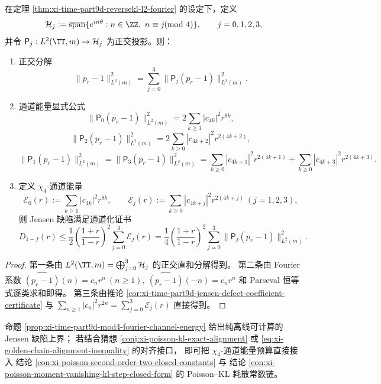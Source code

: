 \begin{proposition}\label{prop:xi-time-part9d-mod4-fourier-channel-energy}
在定理 \ref{thm:xi-time-part9d-reversekl-l2-fourier} 的设定下，定义
\[
\mathcal H_j:=\overline{\mathrm{span}}\{e^{in\theta}:n\in\ZZ,\ n\equiv j\!\!\!\pmod 4\},
\qquad j=0,1,2,3,
\]
并令 \(\mathsf P_j:L^2(\TT,m)\to\mathcal H_j\) 为正交投影。则：
\begin{enumerate}
  \item 正交分解
  \[
  \|p_r-1\|_{L^2(m)}^2=\sum_{j=0}^3\|\mathsf P_j(p_r-1)\|_{L^2(m)}^2.
  \]
  \item 通道能量显式公式
  \[
  \|\mathsf P_0(p_r-1)\|_{L^2(m)}^2
  =2\sum_{k\ge1}|c_{4k}|^2r^{8k},
  \]
  \[
  \|\mathsf P_2(p_r-1)\|_{L^2(m)}^2
  =2\sum_{k\ge0}|c_{4k+2}|^2r^{2(4k+2)},
  \]
  \[
  \|\mathsf P_1(p_r-1)\|_{L^2(m)}^2
  =\|\mathsf P_3(p_r-1)\|_{L^2(m)}^2
  =\sum_{k\ge0}|c_{4k+1}|^2r^{2(4k+1)}
  +\sum_{k\ge0}|c_{4k+3}|^2r^{2(4k+3)}.
  \]
  \item 定义 \(\chi_4\)-通道能量
  \[
  \mathcal E_0(r):=\sum_{k\ge1}|c_{4k}|^2r^{8k},\qquad
  \mathcal E_j(r):=\sum_{k\ge0}|c_{4k+j}|^2r^{2(4k+j)}\ (j=1,2,3),
  \]
  则 Jensen 缺陷满足通道化证书
  \[
  D_{1-f}(r)
  \le \frac12\left(\frac{1+r}{1-r}\right)^2\sum_{j=0}^3\mathcal E_j(r)
  =\frac14\left(\frac{1+r}{1-r}\right)^2\sum_{j=0}^3\|\mathsf P_j(p_r-1)\|_{L^2(m)}^2.
  \]
\end{enumerate}
\end{proposition}
\begin{proof}
第一条由 \(L^2(\TT,m)=\bigoplus_{j=0}^3\mathcal H_j\) 的正交直和分解得到。
第二条由 Fourier 系数
\(
\widehat{(p_r-1)}(n)=c_nr^n\ (n\ge1),\ 
\widehat{(p_r-1)}(-n)=\overline{c_n}r^n
\)
和 Parseval 恒等式逐类求和即得。
第三条由推论 \ref{cor:xi-time-part9d-jensen-defect-coefficient-certificate}
与 \(\sum_{n\ge1}|c_n|^2r^{2n}=\sum_{j=0}^3\mathcal E_j(r)\) 直接得到。
\end{proof}

\begin{remark}
命题 \ref{prop:xi-time-part9d-mod4-fourier-channel-energy} 给出纯离线可计算的 Jensen 缺陷上界；
若结合猜想 \ref{conj:xi-poisson-kl-exact-alignment} 或
\eqref{eq:xi-golden-chain-alignment-inequality} 的对齐接口，
即可把 \(\chi_4\)-通道能量预算直接接入
结论 \ref{con:xi-poisson-second-order-two-closed-constants} 与
结论 \ref{con:xi-poisson-moment-vanishing-kl-step-closed-form}
的 Poisson--KL 耗散常数链。
\end{remark}
